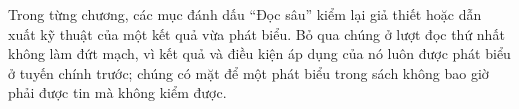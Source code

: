 Trong từng chương, các mục đánh dấu \enquote{Đọc sâu} kiểm lại giả thiết hoặc
dẫn xuất kỹ thuật của một kết quả vừa phát biểu. Bỏ qua chúng ở lượt đọc thứ
nhất không làm đứt mạch, vì kết quả và điều kiện áp dụng của nó luôn được phát
biểu ở tuyến chính trước; chúng có mặt để một phát biểu trong sách không bao
giờ phải được tin mà không kiểm được.







